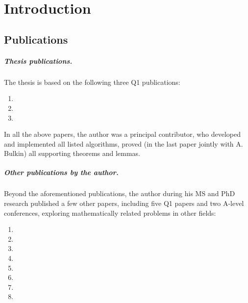 

\chapter*{Introduction}




\section*{Publications}

\paragraph{Thesis publications.} The thesis is based on the following three Q1 publications:

\begin{enumerate}
    \item {}
    \item {}
    \item {}
\end{enumerate}

In all the above papers, the author was a principal contributor, who developed and implemented all listed algorithms, proved (in the last paper jointly with A. Bulkin) all supporting theorems and lemmas. 

\paragraph{Other publications by the author.} Beyond the aforementioned publications, the author during his MS and PhD research published a few other papers, including five Q1 papers and two A-level conferences, exploring mathematically related problems in other fields:
\begin{enumerate}
    \item {}
    \item {}
    \item {}
    \item {}
    \item {}
    \item {}
    \item {}
    \item {}
\end{enumerate}

